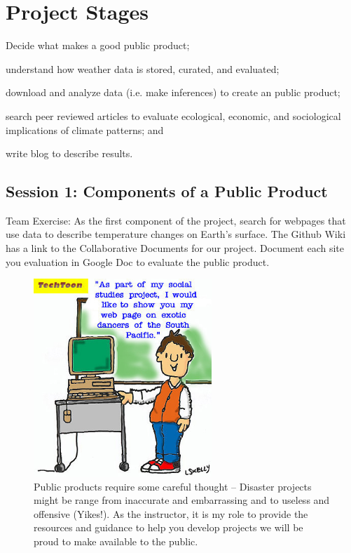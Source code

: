 \documentclass{article}\usepackage[]{graphicx}\usepackage[]{color}
\newenvironment{enumerate*}%
  {\begin{enumerate}%
    \setlength{\itemsep}{0pt}%
    \setlength{\parskip}{0pt}}%
  {\end{enumerate}}
\begin{document}
\section{Project Stages}

\begin{enumerate*}
  \item Decide what makes a good public product;
  \item understand how weather data is stored, curated, and evaluated; 
  \item download and analyze data (i.e. make inferences) to create an public product;
  \item search peer reviewed articles to evaluate ecological, economic, and sociological implications of climate patterns; and
  \item write blog to describe results. 
\end{enumerate*}

\subsection{Session 1: Components of a Public Product}

Team Exercise: As the first component of the project, search for webpages that use data to describe temperature changes on Earth's surface. The Github Wiki has a link to the Collaborative Documents for our project. Document each site you evaluation in Google Doc to evaluate the public product.

\begin{figure}
  \centering
	\includegraphics[width=0.60\textwidth]{figure/PublicProductDisasters.jpg}
	\caption{Public products require some careful thought -- Disaster projects might be range from  inaccurate and embarrassing and to useless and offensive (Yikes!). As the instructor, it is my role to provide the resources and guidance to help you develop projects we will be proud to make available to the public.}
	\label{fig:PublicProductDisasters}
\end{figure}
\end{document}
